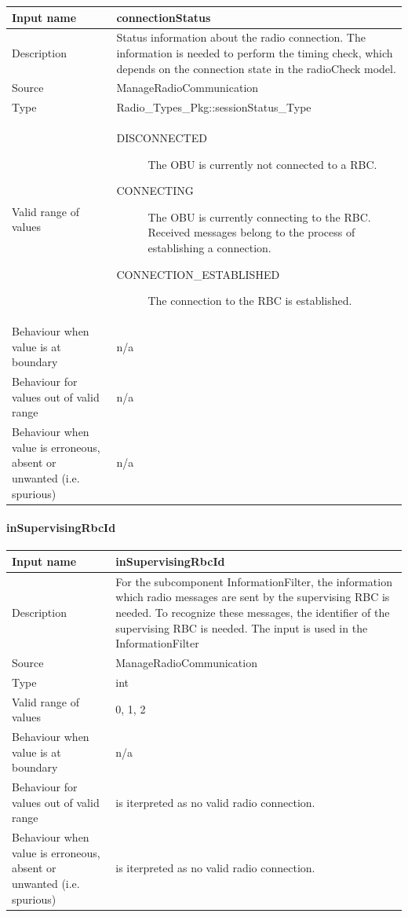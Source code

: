 \begin{longtable}{p{}p{}}
\toprule
Input name				& connectionStatus \\
\midrule
Description				& Status information about the radio connection. The information is needed to perform the timing check, which depends on the connection state in the radioCheck model. \\
\midrule
Source					& ManageRadioCommunication \\ 
\midrule
Type					& Radio\_Types\_Pkg::sessionStatus\_Type \\
\midrule
Valid range of values	& 
\begin{description}
\item[DISCONNECTED] The OBU is currently not connected to a RBC.
\item[CONNECTING] The OBU is currently connecting to the RBC. Received messages belong to the process of establishing a connection.
\item[CONNECTION\_ESTABLISHED] The connection to the RBC is established.
\end{description} \\
\midrule
Behaviour when value is at boundary	& n/a\\
\midrule
Behaviour for values out of valid range	& n/a\\
\midrule
Behaviour when value is erroneous, absent or unwanted (i.e. spurious) & n/a\\
\bottomrule
\end{longtable}


\paragraph{inSupervisingRbcId}

\begin{longtable}{p{}p{}}
\toprule
Input name				& inSupervisingRbcId \\
\midrule
Description				& For the subcomponent InformationFilter, the information which radio messages are sent by the supervising RBC is needed. To recognize these messages, the identifier of the supervising RBC is needed. The input is used in the InformationFilter \\
\midrule
Source					& ManageRadioCommunication\\ 
\midrule
Type					& int \\
\midrule
Valid range of values	& 0, 1, 2
 \\
\midrule
Behaviour when value is at boundary	& n/a\\
\midrule
Behaviour for values out of valid range	&  is iterpreted as no valid radio connection.\\
\midrule
Behaviour when value is erroneous, absent or unwanted (i.e. spurious) &is iterpreted as no valid radio connection.\\
\bottomrule
\end{longtable}


